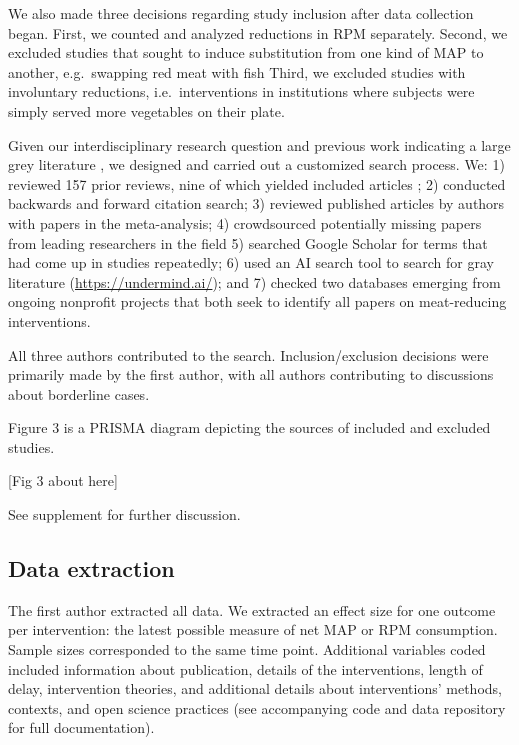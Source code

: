 \documentclass[sn-nature,referee,pdflatex]{sn-jnl}
\begin{document}
We also made three decisions regarding study inclusion after data
collection began. First, we counted and analyzed reductions in RPM
separately. Second, we excluded studies that sought to induce
substitution from one kind of MAP to another, e.g.~swapping red meat
with fish Third, we excluded studies with involuntary reductions,
i.e.~interventions in institutions where subjects were simply served
more vegetables on their plate.

Given our interdisciplinary research question and previous work
indicating a large grey literature \citep{mathur2021meta}, we designed
and carried out a customized search process. We: 1) reviewed 157 prior
reviews, nine of which yielded included articles
\citep{mathur2021meta, bianchi2018conscious, bianchi2018restructuring, ammann2023, chang2023, DiGennaro2024, harguess2020, ronto2022, wynes2018};
2) conducted backwards and forward citation search; 3) reviewed
published articles by authors with papers in the meta-analysis; 4)
crowdsourced potentially missing papers from leading researchers in the
field 5) searched Google Scholar for terms that had come up in studies
repeatedly; 6) used an AI search tool to search for gray literature
(\url{https://undermind.ai/}); and 7) checked two databases emerging
from ongoing nonprofit projects that both seek to identify all papers on
meat-reducing interventions.

All three authors contributed to the search. Inclusion/exclusion
decisions were primarily made by the first author, with all authors
contributing to discussions about borderline cases.

Figure 3 is a PRISMA diagram depicting the sources of included and
excluded studies.

\begin{center}
[Fig 3 about here]
\end{center}

See supplement for further discussion.

\subsection{Data extraction}\label{sec3.3}

The first author extracted all data. We extracted an effect size for one
outcome per intervention: the latest possible measure of net MAP or RPM
consumption. Sample sizes corresponded to the same time point.
Additional variables coded included information about publication,
details of the interventions, length of delay, intervention theories,
and additional details about interventions' methods, contexts, and open
science practices (see accompanying code and data repository for full
documentation).
\end{document}
